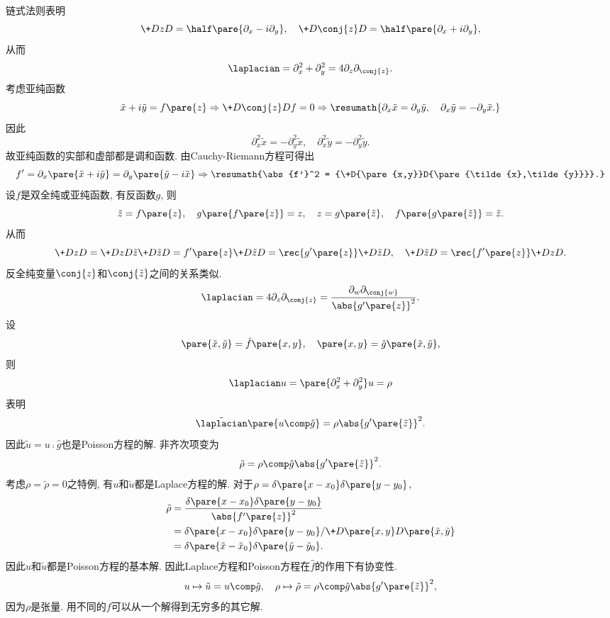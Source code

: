 \documentclass[hidelinks]{ctexart}
\begin{document}
\newpoint{}链式法则表明
\[ \+DzD{} = \half \pare{\partial_x - i\partial_y},\quad \+D{\conj{z}}D{} = \half \pare{\partial_x + i\partial_y}, \]
从而
\[ \laplacian = \partial_x^2 + \partial_y^2 = 4\partial_z\partial_{\conj{z}}. \]
\newpoint{}考虑亚纯函数
\[ \tilde{x} + i\tilde{y} = f\pare{z} \Rightarrow \+D{\conj{z}}Df = 0 \Rightarrow \resumath{\partial_x \tilde{x} = \partial_y \tilde{y},\quad \partial_x \tilde{y} = -\partial_y \tilde{x}.} \]
\newpoint{}因此
\[ \partial_x^2 \tilde{x} = -\partial_y^2 \tilde{x},\quad \partial_x^2 \tilde{y} = -\partial_y^2 \tilde{y}. \]
故亚纯函数的实部和虚部都是调和函数.
\newpoint{}由Cauchy-Riemann方程可得出
\[ f' = \partial_x \pare{\tilde{x} + i\tilde{y}} = \partial_y \pare{\tilde{y} - i\tilde{x}} \Rightarrow \resumath{\abs{f'}^2 = {\+D{\pare{x,y}}D{\pare{\tilde{x},\tilde{y}}}}.} \]
 设$f$是双全纯或亚纯函数, 有反函数$g$, 则
\[ \tilde{z} = f\pare{z},\quad g\pare{f\pare{z}} = z,\quad z = g\pare{\tilde{z}},\quad f\pare{g\pare{\tilde{z}}} = \tilde{z}. \]
从而
\[ \+DzD{} = \+DzD{\tilde{z}} \+D{\tilde{z}}D{} = f'\pare{z}\+D{\tilde{z}}D{} = \rec{g'\pare{z}}\+D{\tilde{z}}D{},\quad \+D{\tilde{z}}D{} = \rec{f'\pare{z}}\+DzD{}. \]
反全纯变量$\conj{z}$和$\conj{\tilde{z}}$之间的关系类似.
\[ \laplacian = 4\partial_z \partial_{\conj{z}} = \frac{\partial_w \partial_{\conj{w}}}{\abs{g'\pare{z}}^2}. \]
\newpoint{}设
\[ \pare{\tilde{x},\tilde{y}} = \hat f\pare{x,y},\quad \pare{x,y} = \hat g\pare{\tilde{x},\tilde{y}}, \]
则
\[ \laplacian u = \pare{\partial_x^2 + \partial_y^2} u = \rho \]
表明
\[ \tilde{\laplacian} \pare{u\comp \hat g} = \rho\abs{g'\pare{\tilde{z}}}^2. \]
因此$\tilde{u} = u\comp \hat{g}$也是Poisson方程的解. 非齐次项变为
\[ \tilde{\rho} = \rho\comp \hat g\abs{g'\pare{\tilde{z}}}^2. \]
\newpoint{}考虑$\rho = \tilde{\rho} = 0$之特例,  有$u$和$\tilde{u}$都是Laplace方程的解. 对于$\rho = \delta\pare{x-x_0}\delta\pare{y-y_0}$,
\begin{align*}
    \tilde{\rho} &= \frac{\delta\pare{x-x_0}\delta\pare{y-y_0}}{\abs{f'\pare{z}}^2} \\
    &= \delta\pare{x-x_0}\delta\pare{y-y_0}/\+D{\pare{x,y}}D{\pare{\tilde{x},\tilde{y}}} \\
    &= \delta\pare{\tilde{x} - \tilde{x}_0}\delta\pare{\tilde{y} - \tilde{y}_0}.
\end{align*}
因此$u$和$\tilde{u}$都是Poisson方程的基本解.
\newpoint{}因此Laplace方程和Poisson方程在$\hat f$的作用下有协变性.
\[ u \mapsto \tilde{u} = u\comp \hat g,\quad \rho \mapsto \tilde{\rho} = \rho \comp \hat g \abs{g'\pare{\tilde{z}}}^2, \]
因为$\rho$是张量.
\newpoint{}用不同的$f$可以从一个解得到无穷多的其它解.
\end{document}
